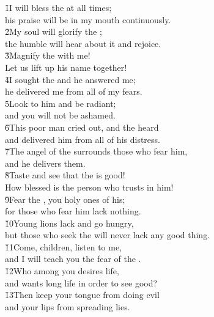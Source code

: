 \begin{poetry}
\poeml \v{1}I will bless the  at all times; \\
\poemll    his praise will be in my mouth continuously. \\
\poeml \v{2}My soul will glorify the ; \\
\poemll    the humble will hear about it and rejoice. \\
\poeml \v{3}Magnify the  with me! \\
\poeml Let us lift up his name together! \\
\poeml \v{4}I sought the  and he answered me; \\
\poemll    he delivered me from all of my fears. \\
\poeml \v{5}Look to him and be radiant; \\
\poemll    and you will not be ashamed. \\
\poeml \v{6}This poor man cried out, and the  heard \\
\poemll    and delivered him from all of his distress. \\
\poeml \v{7}The angel of the  surrounds those who fear him, \\
\poemll    and he delivers them. \\
\poeml \v{8}Taste and see that the  is good! \\
\poemll    How blessed is the person who trusts in him! \\
\poeml \v{9}Fear the , you holy ones of his; \\
\poemll    for those who fear him lack nothing. \\
\poeml \v{10}Young lions lack and go hungry, \\
\poemll    but those who seek the  will never lack any good thing. \\
\poeml \v{11}Come, children, listen to me, \\
\poemll    and I will teach you the fear of the . \\
\poeml \v{12}Who among you desires life, \\
\poemll    and wants long life in order to see good? \\
\poeml \v{13}Then keep your tongue from doing evil \\
\poemll    and your lips from spreading lies. \\

\end{poetry}

